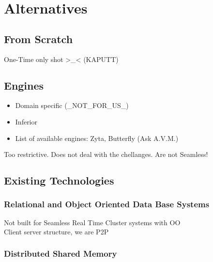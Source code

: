 \section{Alternatives}

\subsection{From Scratch}

One-Time only shot >\_< (KAPUTT)

\subsection{\MMORG Engines}

\begin{itemize}
	\item Domain specific (\_NOT\_FOR\_US\_)
	\item Inferior
	\item List of available engines: Zyta, Butterfly (Ask A.V.M.)
\end{itemize}

Too restrictive. Does not deal with the chellanges. Are not Seamless!

\subsection{Existing Technologies}

\subsubsection{Relational and Object Oriented Data Base Systems}

Not built for Seamless Real Time Cluster systems with OO\\
Client server structure, we are P2P

\subsubsection{Distributed Shared Memory}

